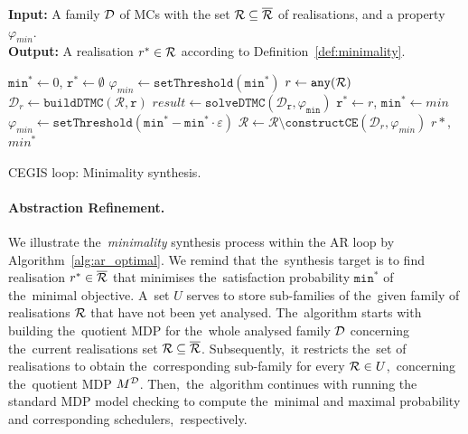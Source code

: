 \begin{algorithm}[h!]
\hspace*{\algorithmicindent} \textbf{Input:} A family $\mathcal{D}$ of MCs with the set $\mathcal{R} \subseteq \overline{\mathcal{R}}$ of realisations, and a property $\varphi_{min}$. \\
\hspace*{\algorithmicindent} \textbf{Output:}  A realisation $r^* \in \mathcal{R}$ according to Definition~\ref{def:minimality}. \\
\vspace*{-1.5em}
\begin{algorithmic}[1]
    \STATE $\mathtt{min^*} \leftarrow 0$, $\mathtt{r^*} \leftarrow \emptyset$
    \STATE $\varphi_{min} \leftarrow \mathtt{setThreshold(min^*)}$
    \WHILE{$\rlz \neq \emptyset$}
        \STATE $r \leftarrow \mathtt{any(\mathcal{R})}$
        \STATE $\mathcal{D}_r\leftarrow \mathtt{buildDTMC(\mathcal{R}, r)}$
        \STATE $result \leftarrow \mathtt{solveDTMC(\mathcal{D}_r, \varphi_{min})}$
            \STATE $\mathtt{r^*} \leftarrow r$, $\mathtt{min^*} \leftarrow min$
            \STATE $\varphi_{min} \leftarrow \mathtt{setThreshold(min^* - min^* \cdot \varepsilon)}$
        \ELSE
            \STATE $\mathcal{R} \leftarrow \mathcal{R} \setminus \mathtt{constructCE}(\mathcal{D}_r, \varphi_{min})$
        \ENDIF
    \ENDWHILE
    \RETURN $r*$, $min^*$
\end{algorithmic}
\caption{CEGIS loop: Minimality synthesis.}
\label{alg:cegis_optimal}
\end{algorithm}

\paragraph{Abstraction Refinement.}
We illustrate the~\textit{minimality} synthesis process within the AR loop by Algorithm~\ref{alg:ar_optimal}.
We remind that the~synthesis target is to find realisation $r^* \in \overline{\mathcal{R}}$ that minimises the~satisfaction probability $\mathtt{min^*}$ of the~minimal objective.
A~set $U$ serves to store sub-families of the~given family of realisations $\mathcal{R}$ that have not been yet analysed.
The~algorithm starts with building the~quotient MDP for the~whole analysed family $\mathcal{D}$ concerning the~current realisations set $\mathcal{R} \subseteq \overline{\mathcal{R}}$.
Subsequently,~it restricts the~set of realisations to obtain the~corresponding sub-family for every $\mathcal{R} \in U$,~concerning the~quotient MDP $M^{\mathcal{D}}$. 
Then,~the~algorithm continues with running the standard MDP model checking to compute the~minimal and maximal probability and corresponding schedulers,~respectively.

